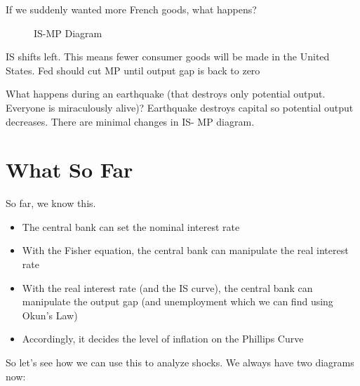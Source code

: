 \documentclass[11pt]{scrartcl}
\newcommand{\og}{\ensuremath{\tilde{Y}}}
\begin{document}
If we suddenly wanted more French goods, what happens?

\begin{figure}[H]
\centering
{}
\caption{\color{blue}IS-\color{black}MP Diagram}
\end{figure}

IS shifts left. This means fewer consumer goods will be made in the United States. Fed should cut MP until output gap is back to zero

What happens during an earthquake (that destroys only potential output. Everyone is miraculously alive)? Earthquake destroys capital so potential output decreases. There are minimal changes in IS- MP diagram.

\section{What So Far}

So far, we know this.

\begin{itemize}
\item The central bank can set the nominal interest rate
\item With the Fisher equation, the central bank can manipulate the real interest rate
\item With the real interest rate (and the IS curve), the central bank can manipulate the output gap (and unemployment which we can find using Okun's Law)
\item Accordingly, it decides the level of inflation on the Phillips Curve
\end{itemize}

So let's see how we can use this to analyze shocks. We always have two diagrams now:
\end{document}
